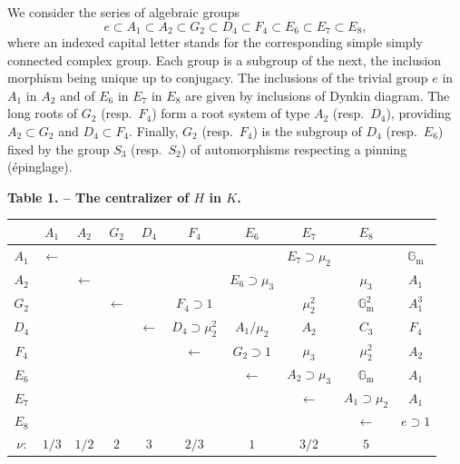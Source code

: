 \documentclass[11pt,a4paper]{article}
\begin{document}
\bigskip
\noindent
We consider the series of algebraic groups
\begin{equation}
e \subset A_{1} \subset A_{2} \subset G_{2} \subset D_{4} \subset F_{4} \subset E_{6} \subset E_{7} \subset E_{8},
\end{equation}
where an indexed capital letter stands for the corresponding simple simply connected complex group. Each group is a subgroup of the next, the inclusion morphism being unique up to conjugacy. The inclusions of the trivial group $e$ in $A_{1}$ in $A_{2}$ and of $E_{6}$ in $E_{7}$ in $E_{8}$ are given by inclusions of Dynkin diagram. The long roots of $G_{2}$ (resp.~$F_{4}$) form a root system of type $A_{2}$ (resp.~$D_{4}$), providing $A_{2} \subset G_{2}$ and $D_{4} \subset F_{4}$. Finally, $G_{2}$ (resp.~$F_{4}$) is the subgroup of $D_{4}$ (resp.~$E_{6}$) fixed by the group $S_{3}$ (resp.~$S_{2}$) of automorphisms respecting a pinning (\'{e}pinglage).

\medskip
\begin{center}
\textbf{Table 1. -- The centralizer of $H$ in $K$.}
\end{center}

\begin{center}
\small
\begin{tabular}{c|ccccccccc}
\toprule
& $A_{1}$ & $A_{2}$ & $G_{2}$ & $D_{4}$ & $F_{4}$ & $E_{6}$ & $E_{7}$ & $E_{8}$ \\
\midrule
$A_{1}$ & $\leftarrow$ & & & & & & $E_{7} \supset \mu_{2}$ & & $\mathbb{G}_{\mathrm{m}}$ \\
$A_{2}$ & & $\leftarrow$ & & & & $E_{6} \supset \mu_{3}$ & & $\mu_{3}$ & $A_{1}$ \\
$G_{2}$ & & & $\leftarrow$ & & $F_{4} \supset 1$ & & $\mu_{2}^{2}$ & $\mathbb{G}_{\mathrm{m}}^{2}$ & $A_{1}^{3}$ \\
$D_{4}$ & & & & $\leftarrow$ & $D_{4} \supset \mu_{2}^{2}$ & $A_{1}/\mu_{2}$ & $A_{2}$ & $C_{3}$ & $F_{4}$ \\
$F_{4}$ & & & & & $\leftarrow$ & $G_{2} \supset 1$ & $\mu_{3}$ & $\mu_{2}^{2}$ & $A_{2}$ \\
$E_{6}$ & & & & & & $\leftarrow$ & $A_{2} \supset \mu_{3}$ & $\mathbb{G}_{\mathrm{m}}$ & $A_{1}$ \\
$E_{7}$ & & & & & & & $\leftarrow$ & $A_{1} \supset \mu_{2}$ & $A_{1}$ \\
$E_{8}$ & & & & & & & & $\leftarrow$ & $e \supset 1$ \\
\midrule
$\nu$: & $1/3$ & $1/2$ & $2$ & $3$ & $2/3$ & $1$ & $3/2$ & $5$ \\
\bottomrule
\end{tabular}
\end{center}
\end{document}
